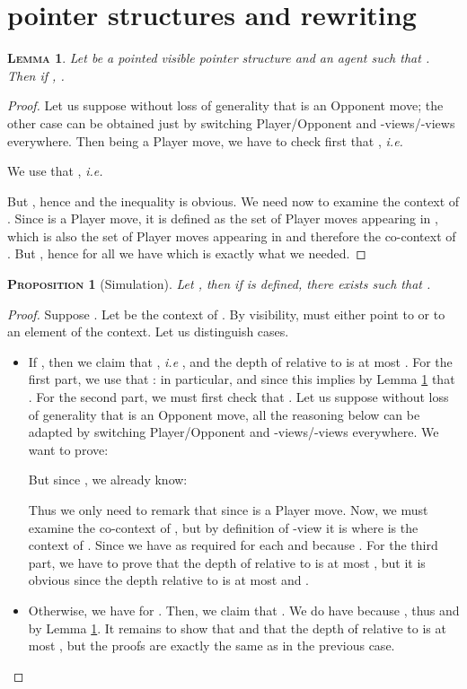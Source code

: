 \documentclass{article}
\newtheorem{lemma}{\textsc{Lemma}}
\newtheorem{proposition}{\textsc{Proposition}}
\begin{document}
\newpage

\appendix

\section{pointer structures and rewriting}

\begin{lemma}
Let  be a pointed visible pointer structure and  an agent such that . Then
if , .
\label{lem_point}
\end{lemma}
\begin{proof}
Let us suppose without loss of generality that  is an Opponent move; the other case can be obtained just by switching Player/Opponent and -views/-views
everywhere. Then  being a Player move, we have to check first that , \emph{i.e.}

We use that , \emph{i.e.}

But , hence  and the inequality is obvious. We need now to examine
the context of . Since  is a Player move, it is defined as the set  of Player moves appearing in
, which is also the set of Player moves appearing in  and therefore the co-context of . But ,
hence for all  we have  which is exactly what we needed.
\end{proof}

\begin{proposition}[Simulation]
Let , then if  is defined, there exists  such that .
\end{proposition}
\begin{proof}
Suppose .
Let  be the context of . By visibility,  must either point to  or to an element of the context. Let us
distinguish cases.
\begin{itemize}
\item If , then we claim that , \emph{i.e} ,
 and the depth of  relative to  is at most . For the first part, we use
that  : in particular,  and since  this implies by Lemma \ref{lem_point} that .
For the second part, we must first check that . Let us suppose without loss of generality that  is an Opponent move, all the
reasoning below can be adapted by switching Player/Opponent and -views/-views everywhere. We want to prove:

But since , we already know:

Thus we only need to remark that  since  is a Player move.
Now, we must examine the co-context of , but by definition of -view it is  where 
is the context of . Since  we have as required  for each 
and  because . For the third part, we have to prove that the depth of  relative to  is at most , but
it is obvious since the depth relative to  is at most  and .

\item Otherwise, we have  for . Then, we claim
that . We do have
 because , thus  and  by Lemma \ref{lem_point}.
It remains to show that  and that the depth of  relative to  is at most , but
the proofs are exactly the same as in the previous case.
\end{itemize}
\end{proof}
\end{document}
